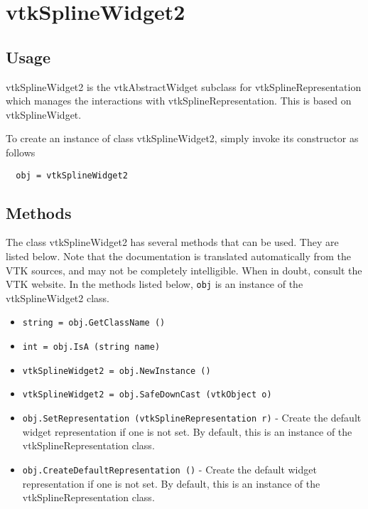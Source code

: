 \section{vtkSplineWidget2}

\subsection{Usage}

 vtkSplineWidget2 is the vtkAbstractWidget subclass for
 vtkSplineRepresentation which manages the interactions with
 vtkSplineRepresentation. This is based on vtkSplineWidget.

To create an instance of class vtkSplineWidget2, simply
invoke its constructor as follows
\begin{verbatim}
  obj = vtkSplineWidget2
\end{verbatim}
\subsection{Methods}

The class vtkSplineWidget2 has several methods that can be used.
  They are listed below.
Note that the documentation is translated automatically from the VTK sources,
and may not be completely intelligible.  When in doubt, consult the VTK website.
In the methods listed below, \verb|obj| is an instance of the vtkSplineWidget2 class.
\begin{itemize}
\item  \verb|string = obj.GetClassName ()|

\item  \verb|int = obj.IsA (string name)|

\item  \verb|vtkSplineWidget2 = obj.NewInstance ()|

\item  \verb|vtkSplineWidget2 = obj.SafeDownCast (vtkObject o)|

\item  \verb|obj.SetRepresentation (vtkSplineRepresentation r)| -  Create the default widget representation if one is not set. By default,
 this is an instance of the vtkSplineRepresentation class.

\item  \verb|obj.CreateDefaultRepresentation ()| -  Create the default widget representation if one is not set. By default,
 this is an instance of the vtkSplineRepresentation class.

\end{itemize}
